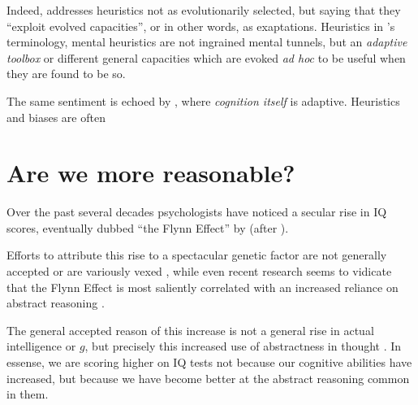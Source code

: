 \documentclass{article}
\begin{document}
Indeed, \textcite{gigerenzer08} addresses heuristics not as evolutionarily selected, but saying that they ``exploit evolved capacities'', or in other words, as exaptations.
Heuristics in \textcite{gigerenzer08}'s terminology, mental heuristics are not ingrained mental tunnels, but an \emph{adaptive toolbox} or different general capacities which are evoked \emph{ad hoc} to be useful when they are found to be so.

The same sentiment is echoed by \textcite{anderson90}, where \emph{cognition itself} is adaptive.
Heuristics and biases are often



\section{Are we more reasonable?}

Over the past several decades psychologists have noticed a secular rise in IQ scores, eventually dubbed ``the Flynn Effect'' by \textcite{herrnstein94} (after \textcite{flynn87}).

Efforts to attribute this rise to a spectacular genetic factor are not generally accepted or are variously vexed \parencite{woodley11}, while even recent research seems to vidicate that the Flynn Effect is most saliently correlated with an increased reliance on abstract reasoning \parencite{must16}.

The general accepted reason of this increase is not a general rise in actual intelligence or $g$, but precisely this increased use of abstractness in thought \parencite{flynn07}.
In essense, we are scoring higher on IQ tests not because our cognitive abilities have increased, but because we have become better at the abstract reasoning common in them.



\printbibliography
\end{document}
